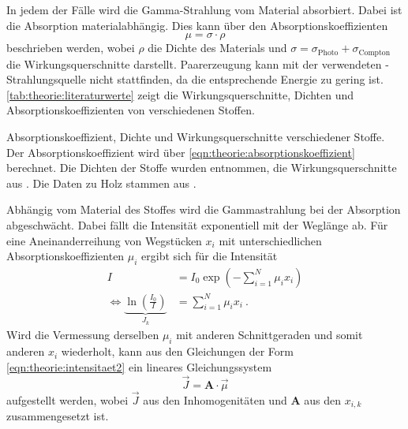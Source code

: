     In jedem der Fälle wird die Gamma-Strahlung vom Material absorbiert.
    Dabei ist die Absorption materialabhängig.
    Dies kann über den Absorptionskoeffizienten
    \begin{equation}
        \mu = \sigma \cdot \rho
        \label{eqn:theorie:absorptionskoeffizient}
    \end{equation}
    beschrieben werden,
    wobei $\rho$ die Dichte des Materials und $\sigma = \sigma_\text{Photo} + \sigma_\text{Compton}$ die Wirkungsquerschnitte darstellt.
    Paarerzeugung kann mit der verwendeten -Strahlungsquelle nicht stattfinden,
    da die entsprechende Energie zu gering ist.
    \autoref{tab:theorie:literaturwerte} zeigt die Wirkungsquerschnitte,
    Dichten und Absorptionskoeffizienten von verschiedenen Stoffen.
    \begin{table}[H]
        \centering
        \caption{Absorptionskoeffizient, Dichte und Wirkungsquerschnitte verschiedener Stoffe.
        Der Absorptionskoeffizient wird über \autoref{eqn:theorie:absorptionskoeffizient} berechnet.
        Die Dichten der Stoffe wurden \cite{dichten} entnommen,
        die Wirkungsquerschnitte aus \cite{crosssections}.
        Die Daten zu Holz stammen aus \cite{holz}.}
        \label{tab:theorie:literaturwerte}
    \end{table}
    Abhängig vom Material des Stoffes wird die Gammastrahlung bei der Absorption abgeschwächt.
    Dabei fällt die Intensität exponentiell mit der Weglänge ab.
    Für eine Aneinanderreihung von Wegstücken $x_i$
    mit unterschiedlichen Absorptionskoeffizienten $\mu_i$
    ergibt sich für die Intensität
    \begin{align}
        I &= I_0 \exp\left(-\sum_{i=1}^N \mu_i x_i \right) \\
        \iff \underbrace{ \ln\left(\frac{I_0}{I}\right) }_{J_k} &= \sum_{i=1}^N \mu_i x_i \ .
        \label{eqn:theorie:intensitaet2}
    \end{align}
    Wird die Vermessung derselben $\mu_i$ mit anderen Schnittgeraden und somit anderen $x_i$ wiederholt,
    kann aus den Gleichungen der Form \eqref{eqn:theorie:intensitaet2} ein lineares Gleichungssystem
    \begin{equation}
        \vec{J} = \symbf{A} \cdot \vec{\mu}
    \end{equation}
    aufgestellt werden,
    wobei $\vec{J}$ aus den Inhomogenitäten
    und $\symbf{A}$ aus den $x_{i,k}$
    zusammengesetzt ist.

